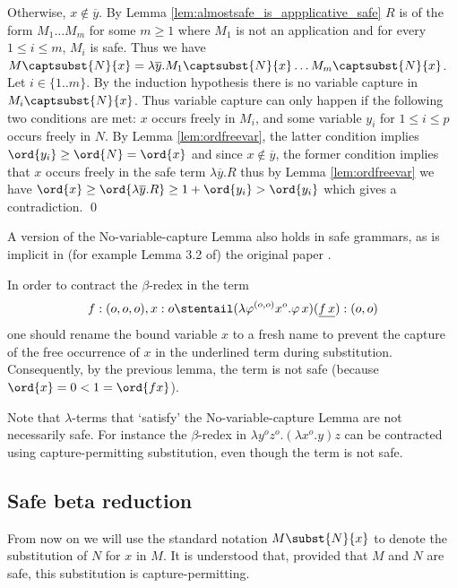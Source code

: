  Otherwise, $x \not\in \overline{y}$. By Lemma \ref{lem:almostsafe_is_appplicative_safe} $R$ is of the
  form $M_1 \ldots M_m$ for some $m\geq 1$ where $M_1$ is not an application and for every $1 \leq i\leq m$, $M_i$ is safe.
 Thus we have $M \captsubst{N}{x} = \lambda \overline{y} . M_1 \captsubst{N}{x} \ldots M_m \captsubst{N}{x}$.  Let $i\in\{1..m\}$. By the induction hypothesis there is no variable capture in $M_i \captsubst{N}{x}$.  Thus variable capture can only happen if the following two conditions are met: $x$ occurs freely in $M_i$, and some variable $y_i$ for $1 \leq i \leq p$ occurs freely in $N$. By Lemma \ref{lem:ordfreevar}, the latter condition implies $\ord{y_i} \geq \ord{N} = \ord{x}$ and  since $x \not \in \overline{y}$, the former condition implies that $x$ occurs freely in the safe term $\lambda \overline{y}. R$
  thus by Lemma \ref{lem:ordfreevar} we have $ \ord{x} \geq
  \ord{\lambda \overline{y} . R} \geq 1+ \ord{y_i} > \ord{y_i}$ which  gives a contradiction.
\qed


\begin{remark}
  A version of the No-variable-capture Lemma also holds in safe
  grammars, as is implicit in (for example Lemma 3.2 of) the original
  paper \cite{KNU02}.
\end{remark}

\begin{example}
  In order to contract the $\beta$-redex in the term
\[f:(o,o,o),x:o
  \stentail (\lambda \varphi^{(o,o)} x^o . \varphi \, x) (\underline{f \,
    x}) : (o,o)\] one should rename the bound variable $x$ to a fresh name to
  prevent the capture of the free occurrence of $x$ in the underlined term during substitution. Consequently, by the previous lemma,
  the term is not safe (because $\ord{x} = 0 < 1
  = \ord{f x}$).
\end{example}

Note that $\lambda$-terms that `satisfy' the No-variable-capture
Lemma are not necessarily safe. For instance the $\beta$-redex in
$\lambda y^o z^o. (\lambda x^o .y) z$ can be contracted using
capture-permitting substitution, even though the term is not safe.

\subsection*{Safe beta reduction}

From now on we will use the standard notation $M\subst{N}{x}$ to
denote the substitution of $N$ for $x$ in $M$.  It is understood that,
provided that $M$ and $N$ are safe, this substitution is
capture-permitting.



